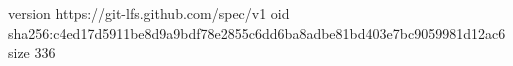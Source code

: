 version https://git-lfs.github.com/spec/v1
oid sha256:c4ed17d5911be8d9a9bdf78e2855c6dd6ba8adbe81bd403e7bc9059981d12ac6
size 336
